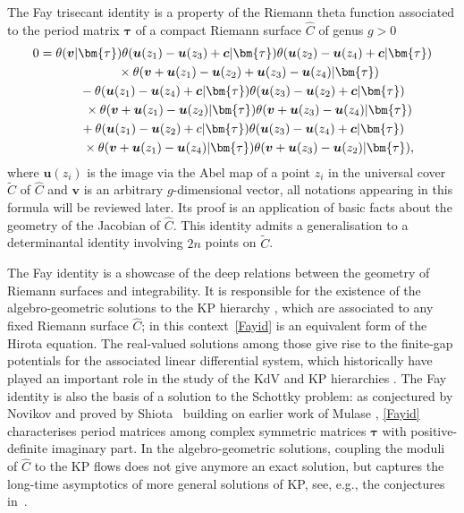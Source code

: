\documentclass[pdftex]{sigma}
\numberwithin{equation}{section}
\begin{document}
The Fay trisecant identity \cite{Fay} is a property of the Riemann theta function associated to the period matrix $\bm{\tau}$ of a compact Riemann surface $\widehat{C}$ of genus $g > 0$
\begin{gather}
0 = \theta(\boldsymbol{v}|\bm{\tau}) \theta (\boldsymbol{u}(z_1) - \boldsymbol{u}(z_3) + \boldsymbol{c} |\bm{\tau} )\theta (\boldsymbol{u}(z_2) - \boldsymbol{u}(z_4) + \boldsymbol{c} |\bm{\tau} ) \nonumber\\
\hphantom{0=}\quad{}
\times \theta (\boldsymbol{v} + \boldsymbol{u}(z_1) - \boldsymbol{u}(z_2) + \boldsymbol{u}(z_3) - \boldsymbol{u}(z_4) |\bm{\tau} ) \nonumber\\
\hphantom{0=}{} - \theta(\boldsymbol{u}(z_1) - \boldsymbol{u}(z_4) + \boldsymbol{c} |\bm{\tau} )\theta (\boldsymbol{u}(z_3) - \boldsymbol{u}(z_2) + \boldsymbol{c} |\bm{\tau} )\nonumber\\
\hphantom{0=}\quad {}\times\theta (\boldsymbol{v} + \boldsymbol{u}(z_1) - \boldsymbol{u}(z_2) |\bm{\tau} )\theta (\boldsymbol{v} + \boldsymbol{u}(z_3) - \boldsymbol{u}(z_4) |\bm{\tau} ) \nonumber\\
\hphantom{0=}{}+ \theta (\boldsymbol{u}(z_1) - \boldsymbol{u}(z_2) + c |\bm{\tau} )\theta (\boldsymbol{u}(z_3) - \boldsymbol{u}(z_4) + \boldsymbol{c} |\bm{\tau} ) \nonumber\\
\hphantom{0=}\quad {}\times \theta (\boldsymbol{v} + \boldsymbol{u}(z_1) - \boldsymbol{u}(z_4) |\bm{\tau} )\theta (\boldsymbol{v} + \boldsymbol{u}(z_3) - \boldsymbol{u}(z_2) |\bm{\tau} ) ,\label{Fayid}
\end{gather}
where $\boldsymbol{u}(z_i)$ is the image via the Abel map of a point $z_i$ in the universal cover $\widetilde{C}$ of $\widehat{C}$ and $\boldsymbol{v}$ is an arbitrary $g$-dimensional vector, all notations appearing in this formula will be reviewed later. Its proof is an application of basic facts about the geometry of the Jacobian of $\widehat{C}$. This identity admits a generalisation to a determinantal identity involving $2n$ points on $\widetilde{C}$.

The Fay identity is a showcase of the deep relations between the
geometry of Riemann surfaces and integrability. It is responsible for
the existence of the algebro-geometric solutions to the KP hierarchy
\cite{Krichever}, which are associated to any fixed Riemann surface $\widehat{C}$; in
this context~\eqref{Fayid} is an equivalent form of the Hirota equation. The
real-valued solutions among those give rise to the finite-gap
potentials for the associated linear differential system, which
historically have played an important role in the study of the KdV and
KP hierarchies \cite{Matveev}. The Fay identity is also the basis of a solution
to the Schottky problem: as conjectured by Novikov and proved by
Shiota~\cite{Shiota} building on earlier work of Mulase \cite{Mulase}, \eqref{Fayid} characterises
period matrices among complex symmetric matrices $\bm{\tau}$ with
positive-definite imaginary part. In the algebro-geometric solutions,
coupling the moduli of $\widehat{C}$ to the KP flows does not give anymore
an exact solution, but captures the long-time asymptotics of more
general solutions of KP, see, e.g., the conjectures in~\cite{BEInt}.
\end{document}
